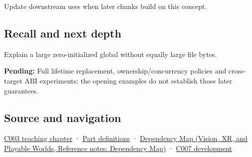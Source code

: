 Update downstream uses when later chunks build on this concept.

\subsection{Recall and next depth}\label{appendix-17c93c4c2f19-recall-and-next-depth}

Explain a large zero-initialized global without equally large file bytes.

\textbf{Pending:} Full lifetime replacement, ownership/concurrency policies and cross-target ABI experiments; the opening examples do not establish those later guarantees.

\subsection{Source and navigation}\label{appendix-17c93c4c2f19-source-and-navigation}

\hyperref[01-foundations-i-ch002-where-the-bytes-live]{C003 teaching chapter} · \hyperref[appendix-fd090d982a15-m003---parts-41-60]{Part definitions} · \href{../07-Vision-XR-and-Playable-Worlds/main.pdf\#nameddest=appendix-4ad47bdd269a}{Dependency Map (Vision, XR, and Playable Worlds, Reference notes: Dependency Map)} · \hyperref[01-foundations-i-ch002-a-name-does-not-decide-how-long-storage-lasts]{C007 development}
